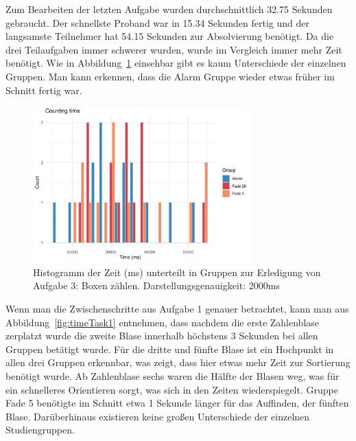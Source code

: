 Zum Bearbeiten der letzten Aufgabe wurden durchschnittlich 32.75 Sekunden gebraucht. Der schnellste Proband war in 15.34 Sekunden fertig und der langsamste Teilnehmer hat 54.15 Sekunden zur Absolvierung benötigt. Da die drei Teilaufgaben immer schwerer wurden, wurde im Vergleich immer mehr Zeit benötigt.
Wie in Abbildung~\ref{fig:countingTimeHistogram} einsehbar gibt es kaum Unterschiede der einzelnen Gruppen. Man kann erkennen, dass die Alarm Gruppe wieder etwas früher im Schnitt fertig war. 

\begin{figure}[H]
	\centering
	\includegraphics[width=0.75\textwidth]{./_StudyResults/countingTimeHist}
	\caption{Histogramm der Zeit (ms) unterteilt in Gruppen zur Erledigung von Aufgabe 3: Boxen zählen. Darstellungsgenauigkeit: 2000ms}
	\label{fig:countingTimeHistogram}
\end{figure}

Wenn man die Zwischenschritte aus Aufgabe 1 genauer betrachtet, kann man aus Abbildung~\ref{fig:timeTask1} entnehmen, dass nachdem die erste Zahlenblase zerplatzt wurde die zweite Blase innerhalb höchstens 3 Sekunden bei allen Gruppen betätigt wurde. Für die dritte und fünfte Blase ist ein Hochpunkt in allen drei Gruppen erkennbar, was zeigt, dass hier etwas mehr Zeit zur Sortierung benötigt wurde. Ab Zahlenblase sechs waren die Hälfte der Blasen weg, was für ein schnelleres Orientieren sorgt, was sich in den Zeiten wiederspiegelt. Gruppe Fade 5 benötigte im Schnitt etwa 1 Sekunde länger für das Auffinden, der fünften Blase. Darüberhinaus existieren keine großen Unterschiede der einzelnen Studiengruppen.
 

